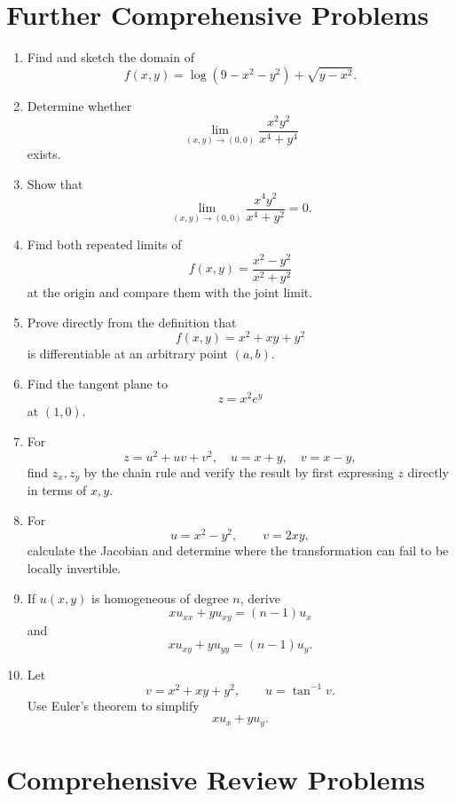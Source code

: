 \documentclass[11pt,oneside]{book}
\theoremstyle{studentthm}
\theoremstyle{definition}
\begin{document}
\section{Further Comprehensive Problems}

\begin{enumerate}
\item Find and sketch the domain of
\[
f(x,y)=\log(9-x^2-y^2)+\sqrt{y-x^2}.
\]

\item Determine whether
\[
\lim_{(x,y)\to(0,0)}
\frac{x^2y^2}{x^4+y^4}
\]
exists.

\item Show that
\[
\lim_{(x,y)\to(0,0)}
\frac{x^4y^2}{x^4+y^2}=0.
\]

\item Find both repeated limits of
\[
f(x,y)=\frac{x^2-y^2}{x^2+y^2}
\]
at the origin and compare them with the joint limit.

\item Prove directly from the definition that
\[
f(x,y)=x^2+xy+y^2
\]
is differentiable at an arbitrary point \((a,b)\).

\item Find the tangent plane to
\[
z=x^2e^y
\]
at \((1,0)\).

\item For
\[
z=u^2+uv+v^2,\quad
u=x+y,\quad
v=x-y,
\]
find \(z_x,z_y\) by the chain rule and verify the result by first
expressing \(z\) directly in terms of \(x,y\).

\item For
\[
u=x^2-y^2,\qquad v=2xy,
\]
calculate the Jacobian and determine where the transformation can fail
to be locally invertible.

\item If \(u(x,y)\) is homogeneous of degree \(n\), derive
\[
xu_{xx}+yu_{xy}=(n-1)u_x
\]
and
\[
xu_{xy}+yu_{yy}=(n-1)u_y.
\]

\item Let
\[
v=x^2+xy+y^2,\qquad
u=\tan^{-1}v.
\]
Use Euler's theorem to simplify
\[
xu_x+yu_y.
\]
\end{enumerate}


\section{Comprehensive Review Problems}
\end{document}

